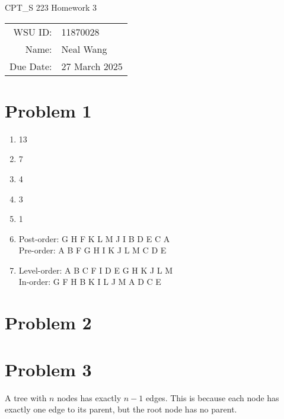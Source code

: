 \documentclass[12pt]{article}
\theoremstyle{definition}
\begin{document}
\begin{center}
  {\Large CPT\_S 223 Homework 3}
  $ $\\
  $ $\\
  \begin{tabular}{rl}
    WSU ID: & 11870028 \\
    Name: & Neal Wang \\
    Due Date: & 27 March 2025
  \end{tabular}
\end{center}

\section{Problem 1}

\begin{enumerate}[label=(\alph*)]
  \item 13
  \item 7
  \item 4
  \item 3
  \item 1
  \item Post-order: G H F K L M J I B D E C A \\
    Pre-order: A B F G H I K J L M C D E
  \item Level-order: A B C F I D E G H K J L M \\
    In-order: G F H B K I L J M A D C E
\end{enumerate}

\section{Problem 2}


\section{Problem 3}

A tree with $n$ nodes has exactly $n - 1$ edges. This is because each
node has exactly one edge to its parent, but the root node has no parent.
\end{document}
